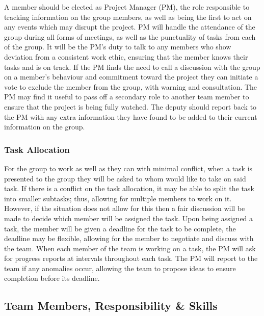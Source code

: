\documentclass[
  english,
  a4paper,
,tablecaptionabove
]{scrartcl}
\begin{document}
A member should be elected as Project Manager (PM), the role responsible
to tracking information on the group members, as well as being the first
to act on any events which may disrupt the project. PM will handle the
attendance of the group during all forms of meetings, as well as the
punctuality of tasks from each of the group. It will be the PM's duty to
talk to any members who show deviation from a consistent work ethic,
ensuring that the member knows their tasks and is on track. If the PM
finds the need to call a discussion with the group on a member's
behaviour and commitment toward the project they can initiate a vote to
exclude the member from the group, with warning and consultation. The PM
may find it useful to pass off a secondary role to another team member
to ensure that the project is being fully watched. The deputy should
report back to the PM with any extra information they have found to be
added to their current information on the group.

\hypertarget{task-allocation}{%
\subsubsection{Task Allocation}\label{task-allocation}}

For the group to work as well as they can with minimal conflict, when a
task is presented to the group they will be asked to whom would like to
take on said task. If there is a conflict on the task allocation, it may
be able to split the task into smaller subtasks; thus, allowing for
multiple members to work on it. However, if the situation does not allow
for this then a fair discussion will be made to decide which member will
be assigned the task. Upon being assigned a task, the member will be
given a deadline for the task to be complete, the deadline may be
flexible, allowing for the member to negotiate and discuss with the
team. When each member of the team is working on a task, the PM will ask
for progress reports at intervals throughout each task. The PM will
report to the team if any anomalies occur, allowing the team to propose
ideas to ensure completion before its deadline.

\newpage

\hypertarget{team-members-responsibility-skills}{%
\subsection{Team Members, Responsibility \&
Skills}\label{team-members-responsibility-skills}}
\end{document}
